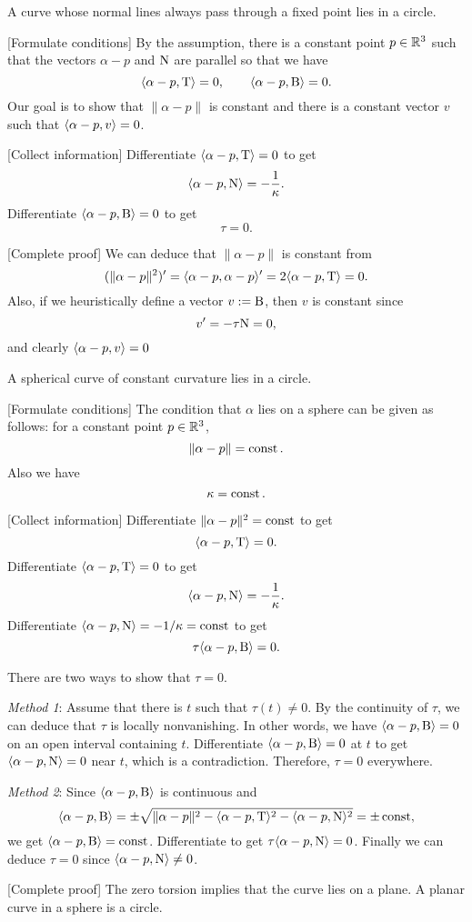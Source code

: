 \documentclass{../note}
\def\a{\alpha}
\begin{document}
\begin{prb}
A curve whose normal lines always pass through a fixed point lies in a circle.
\end{prb}
\begin{sol}
[Formulate conditions]
By the assumption, there is a constant point $p\in\mathbb{R}^3$ such that the vectors $\a-p$ and $\mathrm{N}$ are parallel so that we have
\[\<\a-p,\rT\>=0,\qquad\<\a-p,\rB\>=0.\]
Our goal is to show that $\|\a-p\|$ is constant and there is a constant vector $v$ such that $\<\a-p,v\>=0$.

[Collect information]
Differentiate $\<\a-p,\rT\>=0$ to get
\[\<\a-p,\rN\>=-\frac1\kappa.\]
Differentiate $\<\a-p,\rB\>=0$ to get
\[\tau=0.\]

[Complete proof]
We can deduce that $\|\a-p\|$ is constant from
\[(\|\a-p\|^2)'=\<\a-p,\a-p\>'=2\<\a-p,\rT\>=0.\]
Also, if we heuristically define a vector $v:=\mathrm{B}$, then $v$ is constant since
\[v'=-\tau\mathrm{N}=0,\]
and clearly $\<\a-p,v\>=0$
\end{sol}

\begin{prb}
A spherical curve of constant curvature lies in a circle.
\end{prb}
\begin{sol}
[Formulate conditions]
The condition that $\a$ lies on a sphere can be given as follows: for a constant point $p\in\mathbb{R}^3$,
\[\|\a-p\|=\const.\]
Also we have
\[\kappa=\operatorname{const}.\]

[Collect information]
Differentiate $\|\a-p\|^2=\const$ to get
\[\<\a-p,\rT\>=0.\]
Differentiate $\<\a-p,\rT\>=0$ to get
\[\<\a-p,\rN\>=-\frac1\kappa.\]
Differentiate $\<\a-p,\rN\>=-1/\kappa=\const$ to get
\[\tau\<\a-p,\rB\>=0.\]

There are two ways to show that $\tau=0$.

\emph{Method 1}:
Assume that there is $t$ such that $\tau(t)\ne0$.
By the continuity of $\tau$, we can deduce that $\tau$ is locally nonvanishing.
In other words, we have $\<\a-p,\rB\>=0$ on an open interval containing $t$.
Differentiate $\<\a-p,\rB\>=0$ at $t$ to get $\<\a-p,\rN\>=0$ near $t$, which is a contradiction.
Therefore, $\tau=0$ everywhere.

\emph{Method 2}:
Since $\<\a-p,\rB\>$ is continuous and
\[\<\a-p,\rB\>=\pm\sqrt{\|\a-p\|^2-\<\a-p,\rT\>^2-\<\a-p,\rN\>^2}=\pm\const,\]
we get $\<\a-p,\rB\>=\const$.
Differentiate to get $\tau\<\a-p,\rN\>=0$.
Finally we can deduce $\tau=0$ since $\<\a-p,\rN\>\ne0$.

[Complete proof]
The zero torsion implies that the curve lies on a plane.
A planar curve in a sphere is a circle.
\end{sol}
\end{document}
